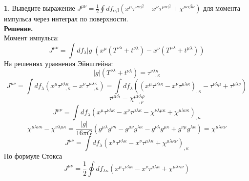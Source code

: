\documentclass[12pt]{article}
\theoremstyle{definition}
\newtheorem{zad}{}[section]
\begin{document}
\begin{zad}
Выведите выражение $J^{\mu\nu}=\frac{1}{2}\oint df_{\alpha\beta}(x^\mu\tau^{\nu\alpha\beta}-x^\nu\tau^{\mu\alpha\beta}+\chi^{\mu\alpha\beta\nu})$ для момента импульса через интеграл по поверхности.\\
\textbf{Решение.}\\
Момент импульса:
\begin{equation}
    J^{\mu\nu}=\int df_\lambda|g|(x^\mu(T^{\nu\lambda}+t^{\nu\lambda})-x^\nu(T^{\mu\lambda}+t^{\mu\lambda}))
\end{equation}
На решениях уравнения Эйнштейна:
\begin{equation}
    |g|(T^{\nu\lambda}+t^{\nu\lambda})=\tau^{\nu\lambda\kappa}_{\quad,\kappa}
\end{equation}
\begin{equation}
    J^{\mu\nu}=\int df_\lambda(x^\mu \tau^{\nu\lambda\kappa}_{\quad,\kappa}-x^\nu \tau^{\mu\lambda\kappa}_{\quad,\kappa})=\int df_\lambda((x^\mu \tau^{\nu\lambda\kappa}-x^\nu \tau^{\mu\lambda\kappa})_{,\kappa}- \tau^{\nu\lambda\mu}+\tau^{\mu\lambda\nu})
\end{equation}
\begin{equation}
    \tau^{\mu\nu\lambda}=\chi^{\mu\nu\lambda\rho}_{\quad,\rho}
\end{equation}
\begin{equation}
    J^{\mu\nu}=\int df_\lambda(x^\mu \tau^{\nu\lambda\kappa}-x^\nu \tau^{\mu\lambda\kappa}-\chi^{\nu\lambda\mu\kappa}+\chi^{\mu\lambda\nu\kappa})_{,\kappa}
\end{equation}
\begin{equation}
    \chi^{\mu\lambda\nu\kappa}-\chi^{\nu\lambda\mu\kappa}=\frac{|g|}{16\pi G}(g^{\mu\lambda}g^{\nu\kappa}-g^{\mu\nu}g^{\lambda\kappa}-g^{\nu\lambda}g^{\mu\kappa}+g^{\nu\mu}g^{\lambda\kappa})=\chi^{\mu\lambda\kappa\nu}
\end{equation}
\begin{equation}
    J^{\mu\nu}=\int df_\lambda(x^\mu \tau^{\nu\lambda\kappa}-x^\nu \tau^{\mu\lambda\kappa}+\chi^{\mu\lambda\kappa\nu})_{,\kappa}
\end{equation}
По формуле Стокса
\begin{equation}
    \boxed{J^{\mu\nu}=\frac{1}{2}\oint df_{\lambda\kappa}(x^\mu \tau^{\nu\lambda\kappa}-x^\nu \tau^{\mu\lambda\kappa}+\chi^{\mu\lambda\kappa\nu})}
\end{equation}
\end{zad}
\end{document}
